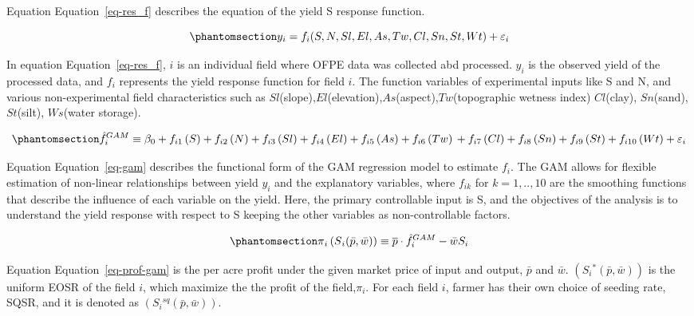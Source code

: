 \documentclass[
]{article}
\begin{document}
Equation Equation~\ref{eq-res_f} describes the equation of the yield S
response function.

\begin{equation}\phantomsection\label{eq-res_f}{
y_i = f_i(S, N, Sl, El, As, Tw, Cl, Sn, St, Wt) + \varepsilon_i
}\end{equation}

In equation Equation~\ref{eq-res_f}, \(i\) is an individual field where
OFPE data was collected abd processed. \(y_i\) is the observed yield of
the processed data, and \(f_i\) represents the yield response function
for field \(i\). The function variables of experimental inputs like S
and N, and various non-experimental field characteristics such as
\(Sl\)(slope),\(El\)(elevation),\(As\)(aspect),\(Tw\)(topographic
wetness index) \(Cl\)(clay), \(Sn\)(sand), \(St\)(silt), \(Ws\)(water
storage).

\begin{equation}\phantomsection\label{eq-gam}{
 \hat{f}^{GAM}_{i} \equiv \beta_0+f_{i1}\left(S\right)+f_{i2}\left(N\right)+f_{i3}\left(Sl\right)+f_{i4 }\left(El\right) +f_{i5}\left(As \right)+f_{i6 }\left(Tw\right) \\ +f_{i7}\left(Cl\right)+f_{i8}\left(Sn\right) +f_{i9}\left(St\right)+f_{i10}\left(Wt\right)+\varepsilon_{i}
}\end{equation}

Equation Equation~\ref{eq-gam} describes the functional form of the GAM
regression model to estimate \(f_i\). The GAM allows for flexible
estimation of non-linear relationships between yield \(y_i\) and the
explanatory variables, where \(f_{ik}\) for \(k={1,..,10}\) are the
smoothing functions that describe the influence of each variable on the
yield. Here, the primary controllable input is S, and the objectives of
the analysis is to understand the yield response with respect to S
keeping the other variables as non-controllable factors.

\begin{equation}\phantomsection\label{eq-prof-gam}{
 \pi{_i} \left(S{_i}(\bar{p}, \bar{w})\right) \equiv\overline { p } \cdot \hat{f}^{GAM}_{i} - \bar{w} S_{i}
}\end{equation}

Equation Equation~\ref{eq-prof-gam} is the per acre profit under the
given market price of input and output, \(\bar{p}\) and \(\bar{w}\).
\(\left(S{_i}^*(\bar{p}, \bar{w})\right)\) is the uniform EOSR of the
field \(i\), which maximize the the profit of the field,\(\pi{_i}\). For
each field \(i\), farmer has their own choice of seeding rate, SQSR, and
it is denoted as \(\left(S{_i}^{sq}(\bar{p}, \bar{w})\right)\).
\end{document}
